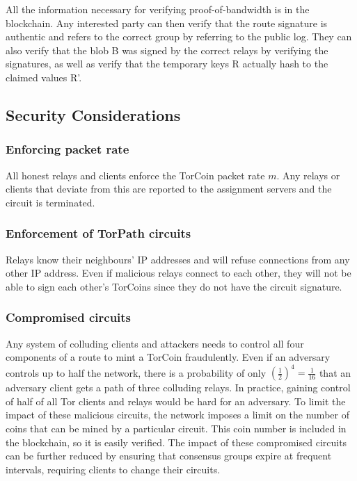 All the information necessary for verifying proof-of-bandwidth is in the
blockchain. Any interested party can then verify that the route signature is
authentic and refers to the correct group by referring to the public log. They
can also verify that the blob B was signed by the correct relays by verifying
the signatures, as well as verify that the temporary keys R actually hash to
the claimed values R'.

\subsection{Security Considerations}

\subsubsection{Enforcing packet rate} All honest relays and clients
enforce the TorCoin packet rate $m$. Any relays or clients that deviate from this
are reported to the assignment servers and the circuit is terminated.

\subsubsection{Enforcement of TorPath circuits} Relays know their neighbours'
IP addresses and will refuse connections from any other IP address. Even if
malicious relays connect to each other, they will not be able to sign each
other's TorCoins since they do not have the circuit signature.

\subsubsection{Compromised circuits} Any system of colluding clients and
attackers needs to control all four components of a route to mint a TorCoin
fraudulently. Even if an adversary controls up to half the network, there is a
probability of only $(\frac{1}{2})^4 = \frac{1}{16}$ that an adversary client
gets a path of three colluding relays. In practice, gaining control of half of
all Tor clients and relays would be hard for an adversary.  To limit the
impact of these malicious circuits, the network imposes a limit on the number
of coins that can be mined by a particular circuit. This coin number is
included in the blockchain, so it is easily verified. 
The impact of these
compromised circuits can be further reduced by ensuring that consensus groups
expire at frequent intervals, requiring clients to change their circuits.

